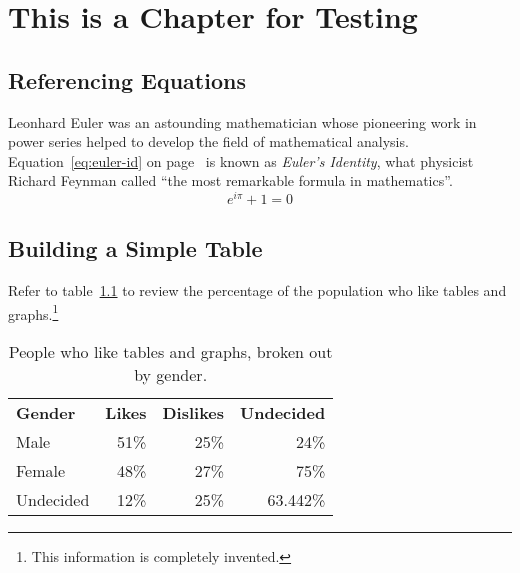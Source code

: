 %
%
%
%
%

\chapter{This is a Chapter for Testing}

\section{Referencing Equations}

Leonhard Euler was an astounding mathematician whose pioneering work
in power series helped to develop the field of mathematical analysis.
Equation~\ref{eq:euler-id} on page~\pageref{eq:euler-id} is known as
\textit{Euler's Identity}, what physicist Richard Feynman called ``the
most remarkable formula in mathematics''.
\begin{equation}
  e^{i\pi} + 1 = 0
  \label{eq:euler-id}
\end{equation}

\section{Building a Simple Table}

Refer to table~\ref{tab:peeps-like-tables} to review the percentage
of the population who like tables and graphs.\footnote{This
information is completely invented.}
\begin{table}
\caption{People who like tables and graphs, broken out by
  gender.\label{tab:peeps-like-tables}}
\centering
\begin{tabular}{lrrr}
\textbf{Gender}&\textbf{Likes}&\textbf{Dislikes}&\textbf{Undecided}\\
Male&51\%&25\%&24\%\\
Female&48\%&27\%&75\%\\
Undecided&12\%&25\%&63.442\%
\end{tabular}
\end{table}

